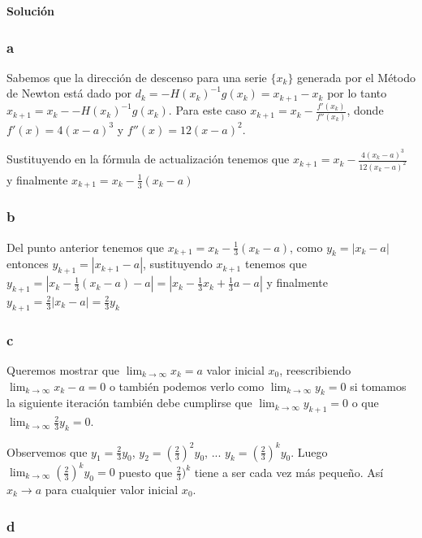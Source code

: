 \documentclass[conference]{IEEEtran}
\begin{document}
\textbf{Solución}


\subsubsection*{a}

Sabemos que la dirección de descenso para una serie $\{x_k\}$ generada por el Método de Newton está
dado por $d_k = -H(x_k)^{-1}g(x_k) = x_{k+1} - x_k$ por lo tanto
$x_{k+1} = x_k - -H(x_k)^{-1}g(x_k)$. Para este caso $x_{k+1} = x_k - \frac{f'(x_k)}{f''(x_k)}$,
donde $f'(x) = 4(x-a)^3$ y $f''(x) = 12(x-a)^2$.

Sustituyendo en la fórmula de actualización tenemos que
$x_{k+1} = x_k - \frac{4(x_k-a)^3}{12(x_k-a)^2}$ y finalmente $x_{k+1} = x_k - \frac{1}{3}(x_k-a)$\\

\subsubsection*{b}

Del punto anterior tenemos que $x_{k+1} = x_k - \frac{1}{3}(x_k-a)$, como $y_{k} = | x_{k} - a|$
entonces $y_{k+1} = |x_{k+1} - a|$, sustituyendo $x_{k+1}$ tenemos que
$y_{k+1} = |x_k - \frac{1}{3}(x_k-a) - a| = |x_k - \frac{1}{3}x_k + \frac{1}{3}a - a|$
y finalmente $y_{k+1} = \frac{2}{3} |x_k -a| = \frac{2}{3}y_k$\\

\subsubsection*{c}

Queremos mostrar que $\lim_{k \to \infty}x_k = a$ valor inicial $x_{0}$,
reescribiendo $\lim_{k \to \infty}x_k - a=0$
o también podemos verlo como $\lim_{k \to \infty}y_k=0$ si tomamos la siguiente iteración también
debe cumplirse que $\lim_{k \to \infty}y_{k+1}=0$ o que $\lim_{k \to \infty}\frac{2}{3}y_{k}=0$.

Observemos que $y_1 = \frac{2}{3}y_0$, $y_2 = (\frac{2}{3})^2y_0$, ... $y_k = (\frac{2}{3})^ky_0$.
Luego $\lim_{k \to \infty}(\frac{2}{3})^ky_{0}=0$ puesto que $\frac{2}{3})^k$ tiene a ser cada vez
más pequeño. Así $x_{k} \rightarrow a$ para cualquier valor inicial $x_{0}$.\\

\subsubsection*{d}
\end{document}
